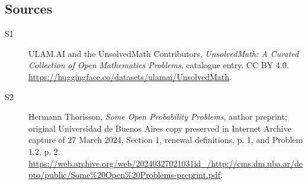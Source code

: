 \documentclass[11pt]{article}
\begin{document}
\subsection{Sources}
\begin{description}
\item[\hypertarget{source:statement:1}{S1}] ULAM.AI and the UnsolvedMath Contributors, \emph{UnsolvedMath: A Curated Collection of Open Mathematics Problems}, catalogue entry. CC BY 4.0. \url{https://huggingface.co/datasets/ulamai/UnsolvedMath}.
\item[\hypertarget{source:statement:2}{S2}] Hermann Thorisson, \emph{Some Open Probability Problems}, author preprint; original Universidad de Buenos Aires copy preserved in Internet Archive capture of 27 March 2024, Section 1, renewal definitions, p. 1, and Problem 1.2, p. 2. \url{https://web.archive.org/web/20240327021031id_/http://cms.dm.uba.ar/depto/public/Some%20Open%20Problems-preprint.pdf}.
\end{description}
\label{end:statement}
\end{document}
